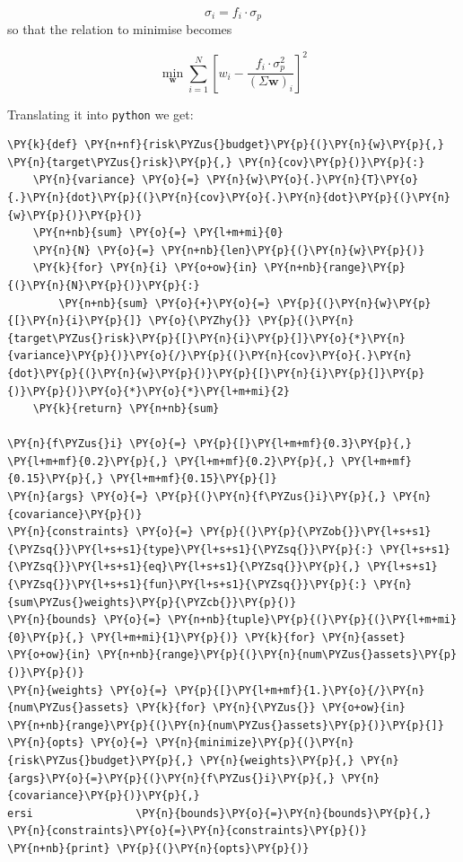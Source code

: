 \begin{equation} \sigma _{i}=f_i \cdot \sigma_p \end{equation}
so that the relation to minimise becomes

\begin{equation} \underset{\mathbf{w}}{\min} \sum _{i=1}^{N}\left[w_{i}-{\frac {f_i \cdot \sigma_p^{2}}{(\Sigma \mathbf{w})_{i}}}\right]^{2} \end{equation}

Translating it into \texttt{python} we get:

\begin{tcolorbox}[breakable, size=fbox, boxrule=1pt, pad at break*=1mm,colback=cellbackground, colframe=cellborder]
\begin{Verbatim}[commandchars=\\\{\}]
\PY{k}{def} \PY{n+nf}{risk\PYZus{}budget}\PY{p}{(}\PY{n}{w}\PY{p}{,} \PY{n}{target\PYZus{}risk}\PY{p}{,} \PY{n}{cov}\PY{p}{)}\PY{p}{:}
    \PY{n}{variance} \PY{o}{=} \PY{n}{w}\PY{o}{.}\PY{n}{T}\PY{o}{.}\PY{n}{dot}\PY{p}{(}\PY{n}{cov}\PY{o}{.}\PY{n}{dot}\PY{p}{(}\PY{n}{w}\PY{p}{)}\PY{p}{)} 
    \PY{n+nb}{sum} \PY{o}{=} \PY{l+m+mi}{0}
    \PY{n}{N} \PY{o}{=} \PY{n+nb}{len}\PY{p}{(}\PY{n}{w}\PY{p}{)}
    \PY{k}{for} \PY{n}{i} \PY{o+ow}{in} \PY{n+nb}{range}\PY{p}{(}\PY{n}{N}\PY{p}{)}\PY{p}{:}
        \PY{n+nb}{sum} \PY{o}{+}\PY{o}{=} \PY{p}{(}\PY{n}{w}\PY{p}{[}\PY{n}{i}\PY{p}{]} \PY{o}{\PYZhy{}} \PY{p}{(}\PY{n}{target\PYZus{}risk}\PY{p}{[}\PY{n}{i}\PY{p}{]}\PY{o}{*}\PY{n}{variance}\PY{p}{)}\PY{o}{/}\PY{p}{(}\PY{n}{cov}\PY{o}{.}\PY{n}{dot}\PY{p}{(}\PY{n}{w}\PY{p}{)}\PY{p}{[}\PY{n}{i}\PY{p}{]}\PY{p}{)}\PY{p}{)}\PY{o}{*}\PY{o}{*}\PY{l+m+mi}{2} 
    \PY{k}{return} \PY{n+nb}{sum}
		
\PY{n}{f\PYZus{}i} \PY{o}{=} \PY{p}{[}\PY{l+m+mf}{0.3}\PY{p}{,} \PY{l+m+mf}{0.2}\PY{p}{,} \PY{l+m+mf}{0.2}\PY{p}{,} \PY{l+m+mf}{0.15}\PY{p}{,} \PY{l+m+mf}{0.15}\PY{p}{]} 
\PY{n}{args} \PY{o}{=} \PY{p}{(}\PY{n}{f\PYZus{}i}\PY{p}{,} \PY{n}{covariance}\PY{p}{)}
\PY{n}{constraints} \PY{o}{=} \PY{p}{(}\PY{p}{\PYZob{}}\PY{l+s+s1}{\PYZsq{}}\PY{l+s+s1}{type}\PY{l+s+s1}{\PYZsq{}}\PY{p}{:} \PY{l+s+s1}{\PYZsq{}}\PY{l+s+s1}{eq}\PY{l+s+s1}{\PYZsq{}}\PY{p}{,} \PY{l+s+s1}{\PYZsq{}}\PY{l+s+s1}{fun}\PY{l+s+s1}{\PYZsq{}}\PY{p}{:} \PY{n}{sum\PYZus{}weights}\PY{p}{\PYZcb{}}\PY{p}{)}          
\PY{n}{bounds} \PY{o}{=} \PY{n+nb}{tuple}\PY{p}{(}\PY{p}{(}\PY{l+m+mi}{0}\PY{p}{,} \PY{l+m+mi}{1}\PY{p}{)} \PY{k}{for} \PY{n}{asset} \PY{o+ow}{in} \PY{n+nb}{range}\PY{p}{(}\PY{n}{num\PYZus{}assets}\PY{p}{)}\PY{p}{)}
\PY{n}{weights} \PY{o}{=} \PY{p}{[}\PY{l+m+mf}{1.}\PY{o}{/}\PY{n}{num\PYZus{}assets} \PY{k}{for} \PY{n}{\PYZus{}} \PY{o+ow}{in} \PY{n+nb}{range}\PY{p}{(}\PY{n}{num\PYZus{}assets}\PY{p}{)}\PY{p}{]}
\PY{n}{opts} \PY{o}{=} \PY{n}{minimize}\PY{p}{(}\PY{n}{risk\PYZus{}budget}\PY{p}{,} \PY{n}{weights}\PY{p}{,} \PY{n}{args}\PY{o}{=}\PY{p}{(}\PY{n}{f\PYZus{}i}\PY{p}{,} \PY{n}{covariance}\PY{p}{)}\PY{p}{,} 
ersi                \PY{n}{bounds}\PY{o}{=}\PY{n}{bounds}\PY{p}{,} \PY{n}{constraints}\PY{o}{=}\PY{n}{constraints}\PY{p}{)}
\PY{n+nb}{print} \PY{p}{(}\PY{n}{opts}\PY{p}{)}
		

\end{Verbatim}
\end{tcolorbox}
